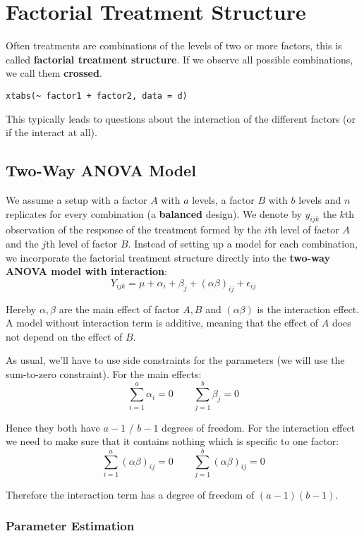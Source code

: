\section{Factorial Treatment Structure}

Often treatments are combinations of the levels of two or more factors, this is called \textbf{factorial treatment structure}. If we observe all possible combinations, we call them \textbf{crossed}.

\begin{lstlisting}
xtabs(~ factor1 + factor2, data = d)
\end{lstlisting}

This typically leads to questions about the interaction of the different factors (or if the interact at all).


\subsection{Two-Way ANOVA Model}

We assume a setup with a factor $A$ with $a$ levels, a factor $B$ with $b$ levels and $n$ replicates for every combination (a \textbf{balanced} design). We denote by $y_{ijk}$ the $k$th observation of the response of the treatment formed by the $i$th level of factor $A$ and the $j$th level of factor $B$. Instead of setting up a model for each combination, we incorporate the factorial treatment structure directly into the \textbf{two-way ANOVA model with interaction}:
$$Y_{ijk} = \mu + \alpha_i + \beta_j + (\alpha \beta)_{ij} + \epsilon_{ij}$$

Hereby $\alpha, \beta$ are the main effect of factor $A, B$ and $(\alpha \beta)$ is the interaction effect. A model without interaction term is additive, meaning that the effect of $A$ does not depend on the effect of $B$.\medskip

As usual, we'll have to use side constraints for the parameters (we will use the sum-to-zero constraint). For the main effects:
$$\sum_{i=1}^a \alpha_i = 0 \qquad \sum_{j=1}^b \beta_j = 0 $$

Hence they both have $a-1$ / $b-1$ degrees of freedom. For the interaction effect we need to make sure that it contains nothing which is specific to one factor:
$$\sum_{i=1}^a (\alpha \beta)_{ij} = 0 \qquad \sum_{j=1}^b (\alpha \beta)_{ij} = 0$$

Therefore the interaction term has a degree of freedom of $(a-1)(b-1)$.

\subsubsection{Parameter Estimation}

